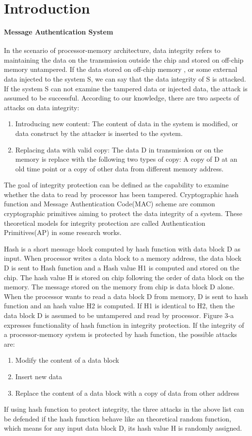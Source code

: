 \documentclass{article}
\begin{document}
\section{Introduction}
\paragraph{Message Authentication System}
In the scenario of processor-memory architecture, data integrity refers to maintaining the data on the transmission outside the chip and stored on off-chip memory untampered. If the data stored on off-chip memory , or some external data injected to the system S, we can say that the data integrity of S is attacked. If the system S can not examine the tampered data or injected data, the attack is assumed to be successful. According to our knowledge, there are two aspects of attacks on data integrity:
\begin{enumerate}
	\item Introducing new content: The content of data in the system is modified, or data construct by the attacker is inserted to the system.
	\item Replacing data with valid copy: The data D in transmission or on the memory is replace with the following two types of copy: A copy of D at an old time point or a copy of other data from different memory address.
\end{enumerate}

The goal of integrity protection can be defined as the capability to examine whether the data to read by processor has been tampered. Cryptographic hash function and Message Authentication Code(MAC) scheme are common cryptographic primitives aiming to protect the data integrity of a system. These theoretical models for integrity protection are called Authentication Primitives(AP) in some research works.

Hash is a short message block computed by hash function with data block D as input.
When processor writes a data block to a memory address, the data block D is sent to Hash function and a Hash value H1 is computed and stored on the chip. The hash value H is stored on chip following the order of data block on the memory. The message stored on the memory from chip is data block D alone.
When the processor wants to read a data block D from memory, D is sent to hash function and an hash value H2 is computed. If H1 is identical to H2, then the data block D is assumed to be untampered and read by processor.
Figure 3-a expresses functionality of hash function in integrity protection.
If the integrity of a processor-memory system is protected by hash function, the possible attacks are:
\begin{enumerate}
	\item Modify the content of a data block
	\item Insert new data
	\item Replace the content of a data block with a copy of data from other address
\end{enumerate}
If using hash function to protect integrity, the three attacks in the above list can be defended if the hash function behave like an theoretical random function, which means for any input data block D, its hash value H is randomly assigned.
\end{document}
